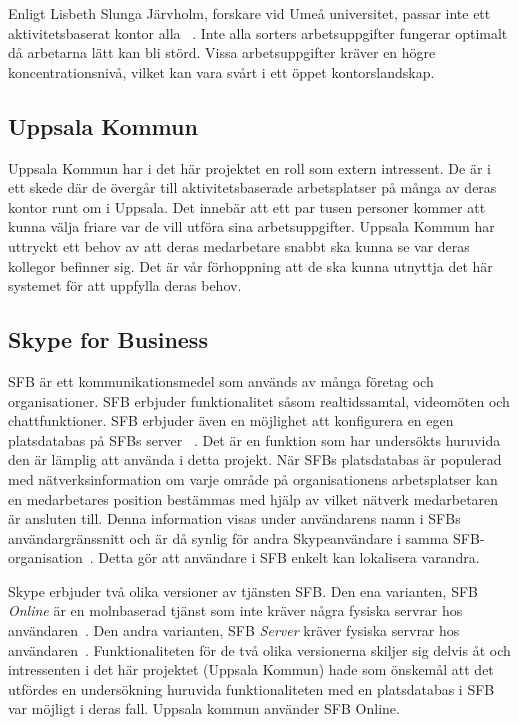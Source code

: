 \documentclass[a4paper,12pt]{article}
\begin{document}
 Enligt Lisbeth Slunga Järvholm, forskare vid Umeå universitet, passar inte ett aktivitetsbaserat kontor alla ~\cite{passarInteAlla}. Inte alla sorters arbetsuppgifter fungerar optimalt då arbetarna lätt kan bli störd. Vissa arbetsuppgifter kräver en högre koncentrationsnivå, vilket kan vara svårt i ett öppet kontorslandskap.

 \subsection{Uppsala Kommun}
 Uppsala Kommun har i det här projektet en roll som extern intressent. De är i ett skede där de övergår till aktivitetsbaserade arbetsplatser på många av deras kontor runt om i Uppsala. Det innebär att ett par tusen personer kommer att kunna välja friare var de vill utföra sina arbetsuppgifter. Uppsala Kommun har uttryckt ett behov av att deras medarbetare snabbt ska kunna se var deras kollegor befinner sig. Det är vår förhoppning att de ska kunna utnyttja det här systemet för att uppfylla deras behov.

 \subsection{Skype for Business}\label{SFB}
 SFB är ett kommunikationsmedel som används av många företag och organisationer. SFB erbjuder funktionalitet såsom realtidssamtal, videomöten och chattfunktioner. SFB erbjuder även en möjlighet att konfigurera en egen platsdatabas på SFBs server ~\cite{Microsoft-Office}. Det är en funktion som har undersökts huruvida den är lämplig att använda i detta projekt. När SFBs platsdatabas är populerad med nätverksinformation om varje område på organisationens arbetsplatser kan en medarbetares position bestämmas med hjälp av vilket nätverk medarbetaren är ansluten till. Denna information visas under användarens namn i SFBs användargränssnitt och är då synlig för andra Skypeanvändare i samma SFB-organisation~\cite{SFBpresence}. Detta gör att användare i SFB enkelt kan lokalisera varandra.

 Skype erbjuder två olika versioner av tjänsten SFB. Den ena varianten, SFB \textit{Online} är en molnbaserad tjänst som inte kräver några fysiska servrar hos användaren~\cite{SFBonline}.
 Den andra varianten, SFB \textit{Server} kräver fysiska servrar hos användaren~\cite{SFBserver}. Funktionaliteten för de två olika versionerna skiljer sig delvis åt och intressenten i det här projektet (Uppsala Kommun) hade som önskemål att det utfördes en undersökning huruvida funktionaliteten med en platsdatabas i SFB var möjligt i deras fall. Uppsala kommun använder SFB Online.
\end{document}
